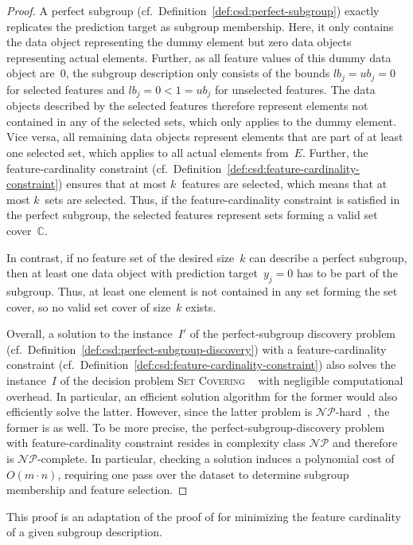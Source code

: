 \documentclass{article}
\theoremstyle{definition}
\begin{document}
\begin{proof}
A perfect subgroup (cf.~Definition~\ref{def:csd:perfect-subgroup}) exactly replicates the prediction target as subgroup membership.
Here, it only contains the data object representing the dummy element but zero data objects representing actual elements.
Further, as all feature values of this dummy data object are~0, the subgroup description only consists of the bounds $\mathit{lb}_j = \mathit{ub}_j = 0$ for selected features and $\mathit{lb}_j = 0 < 1 = \mathit{ub}_j$ for unselected features.
The data objects described by the selected features therefore represent elements not contained in any of the selected sets, which only applies to the dummy element.
Vice versa, all remaining data objects represent elements that are part of at least one selected set, which applies to all actual elements from~$E$.
Further, the feature-cardinality constraint (cf.~Definition~\ref{def:csd:feature-cardinality-constraint}) ensures that at most $k$~features are selected, which means that at most $k$~sets are selected.
Thus, if the feature-cardinality constraint is satisfied in the perfect subgroup, the selected features represent sets forming a valid set cover~$\mathbb{C}$.

In contrast, if no feature set of the desired size~$k$ can describe a perfect subgroup, then at least one data object with prediction target~$y_j = 0$ has to be part of the subgroup.
Thus, at least one element is not contained in any set forming the set cover, so no valid set cover of size~$k$ exists.

Overall, a solution to the instance~$I'$ of the perfect-subgroup discovery problem (cf.~Definition~\ref{def:csd:perfect-subgroup-discovery}) with a feature-cardinality constraint (cf.~Definition~\ref{def:csd:feature-cardinality-constraint}) also solves the instance~$I$ of the decision problem \textsc{Set Covering} ~\cite{karp1972reducibility} with negligible computational overhead.
In particular, an efficient solution algorithm for the former would also efficiently solve the latter.
However, since the latter problem is $\mathcal{NP}$-hard~\cite{karp1972reducibility}, the former is as well.
To be more precise, the perfect-subgroup-discovery problem with feature-cardinality constraint resides in complexity class $\mathcal{NP}$ and therefore is $\mathcal{NP}$-complete.
In particular, checking a solution induces a polynomial cost of~$O(m \cdot n)$, requiring one pass over the dataset to determine subgroup membership and feature selection.
\end{proof}
%
This proof is an adaptation of the proof of \cite{boley2009non} for minimizing the feature cardinality of a given subgroup description.
\end{document}
